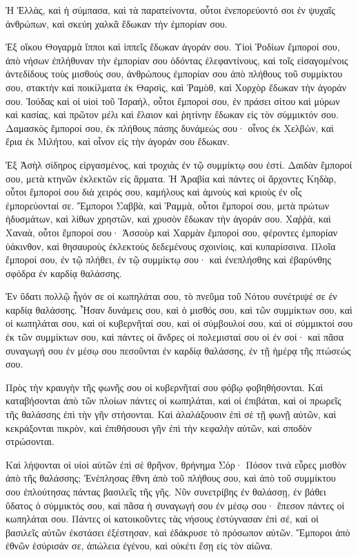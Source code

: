 {Ἡ Ἑλλὰς, καὶ ἡ σύμπασα, καὶ τὰ παρατείνοντα, οὗτοι ἐνεπορεύοντό σοι ἐν ψυχαῖς ἀνθρώπων, καὶ σκεύη χαλκᾶ ἔδωκαν τὴν ἐμπορίαν σου.
\par }{\PP {}Ἐξ οἴκου Θογαρμὰ ἵπποι καὶ ἱππεῖς ἔδωκαν ἀγοράν σου.
Υἱοὶ Ῥοδίων ἔμποροί σου, ἀπὸ νήσων ἐπλήθυναν τὴν ἐμπορίαν σου ὀδόντας ἐλεφαντίνους, καὶ τοῖς εἰσαγομένοις ἀντεδίδους τοὺς μισθούς σου,
ἀνθρώπους ἐμπορίαν σου ἀπὸ πλήθους τοῦ συμμίκτου σου, στακτὴν καὶ ποικίλματα ἐκ Θαρσὶς, καὶ Ῥαμὸθ, καὶ Χορχὸρ ἔδωκαν τὴν ἀγοράν σου.
Ἰούδας καὶ οἱ υἱοὶ τοῦ Ἰσραὴλ, οὗτοι ἔμποροί σου, ἐν πράσει σίτου καὶ μύρων καὶ κασίας, καὶ πρῶτον μέλι καὶ ἔλαιον καὶ ῥητίνην ἔδωκαν εἰς τὸν σύμμικτόν σου.
Δαμασκὸς ἔμποροί σου, ἐκ πλήθους πάσης δυνάμεώς σου· οἶνος ἐκ Χελβὼν, καὶ ἔρια ἐκ Μιλήτου, καὶ οἶνον εἰς τὴν ἀγοράν σου ἔδωκαν.
\par }{\PP {}Ἐξ Ἀσὴλ σίδηρος εἰργασμένος, καὶ τροχιὰς ἐν τῷ συμμίκτῳ σου ἐστί.
Δαιδὰν ἔμποροί σου, μετὰ κτηνῶν ἐκλεκτῶν εἰς ἅρματα.
Ἡ Ἀραβία καὶ πάντες οἱ ἄρχοντες Κηδὰρ, οὗτοι ἔμποροί σου διὰ χειρός σου, καμήλους καὶ ἀμνοὺς καὶ κριοὺς ἐν οἷς ἐμπορεύονταί σε.
Ἔμποροι Σαββὰ, καὶ Ῥαμμὰ, οὗτοι ἔμποροί σου, μετὰ πρώτων ἡδυσμάτων, καὶ λίθων χρηστῶν, καὶ χρυσὸν ἔδωκαν τὴν ἀγοράν σου.
Χαῤῥὰ, καὶ Χαναὰ, οὗτοι ἔμποροί σου·
Ἀσσοὺρ καὶ Χαρμὰν ἔμποροί σου, φέροντες ἐμπορίαν ὑάκινθον, καὶ θησαυροὺς ἐκλεκτοὺς δεδεμένους σχοινίοις, καὶ κυπαρίσσινα.
Πλοῖα ἔμποροί σου, ἐν τῷ πλήθει, ἐν τῷ συμμίκτῳ σου· καὶ ἐνεπλήσθης καὶ ἐβαρύνθης σφόδρα ἐν καρδίᾳ θαλάσσης.
\par }{\PP {}Ἐν ὕδατι πολλῷ ἦγόν σε οἱ κωπηλάται σου, τὸ πνεῦμα τοῦ Νότου συνέτριψέ σε ἐν καρδίᾳ θαλάσσης.
Ἦσαν δυνάμεις σου, καὶ ὁ μισθός σου, καὶ τῶν συμμίκτων σου, καὶ οἱ κωπηλάται σου, καὶ οἱ κυβερνῆταί σου, καὶ οἱ σύμβουλοί σου, καὶ οἱ σύμμικτοί σου ἐκ τῶν συμμίκτων σου, καὶ πάντες οἱ ἄνδρες οἱ πολεμισταί σου οἱ ἐν σοί· καὶ πᾶσα συναγωγή σου ἐν μέσῳ σου πεσοῦνται ἐν καρδίᾳ θαλάσσης, ἐν τῇ ἡμέρᾳ τῆς πτώσεώς σου.
\par }{\PP {}Πρὸς τὴν κραυγὴν τῆς φωνῆς σου οἱ κυβερνῆταί σου φόβῳ φοβηθήσονται.
Καὶ καταβήσονται ἀπὸ τῶν πλοίων πάντες οἱ κωπηλάται, καὶ οἱ ἐπιβάται, καὶ οἱ πρωρεῖς τῆς θαλάσσης ἐπὶ τὴν γῆν στήσονται.
Καὶ ἀλαλάξουσιν ἐπὶ σὲ τῇ φωνῇ αὐτῶν, καὶ κεκράξονται πικρὸν, καὶ ἐπιθήσουσι γῆν ἐπὶ τὴν κεφαλὴν αὐτῶν, καὶ σποδὸν στρώσονται.
\par }{\PP {}Καὶ λήψονται οἱ υἱοὶ αὐτῶν ἐπὶ σὲ θρῆνον, θρήνημα Σόρ·
Πόσον τινὰ εὗρες μισθὸν ἀπὸ τῆς θαλάσσης; Ἐνέπλησας ἔθνη ἀπὸ τοῦ πλήθους σου, καὶ ἀπὸ τοῦ συμμίκτου σου ἐπλούτησας πάντας βασιλεῖς τῆς γῆς.
Νῦν συνετρίβης ἐν θαλάσσῃ, ἐν βάθει ὕδατος ὁ σύμμικτός σου, καὶ πᾶσα ἡ συναγωγή σου ἐν μέσῳ σου· ἔπεσον πάντες οἱ κωπηλάται σου.
Πάντες οἱ κατοικοῦντες τὰς νήσους ἐστύγνασαν ἐπὶ σέ, καὶ οἱ βασιλεῖς αὐτῶν ἐκστάσει ἐξέστησαν, καὶ ἐδάκρυσε τὸ πρόσωπον αὐτῶν.
Ἔμποροι ἀπὸ ἐθνῶν ἐσύρισάν σε, ἀπώλεια ἐγένου, καὶ οὐκέτι ἔσῃ εἰς τὸν αἰῶνα.

}
